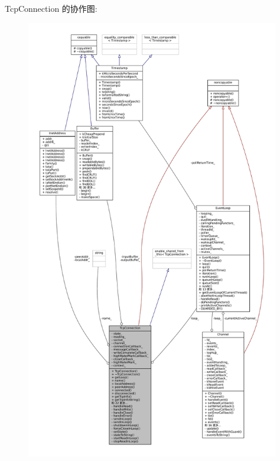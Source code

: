 Tcp\+Connection 的协作图\+:
\nopagebreak
\begin{figure}[H]
\begin{center}
\leavevmode
\includegraphics[height=550pt]{classmuduo_1_1net_1_1TcpConnection__coll__graph}
\end{center}
\end{figure}
